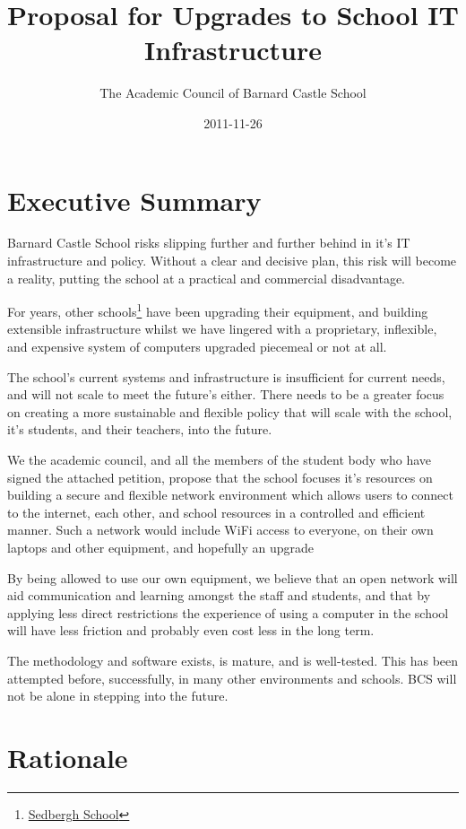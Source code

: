 \documentclass[a4paper,leqno,titlepage]{article}
\title{Proposal for Upgrades to School IT Infrastructure}
\author{The Academic Council of Barnard Castle School}
\date{2011-11-26}
\begin{document}
\maketitle

\section{Executive Summary}

Barnard Castle School risks slipping further and further behind in it's
IT infrastructure and policy.
Without a clear and decisive plan, this risk will become a reality, putting
the school at a practical and commercial disadvantage.


For years, other schools\footnote{\href{http://www.sedberghschool.org/ict.html}{Sedbergh School}} 
have been upgrading their equipment, and building extensible infrastructure
whilst we have lingered with a proprietary, inflexible, and expensive system of
computers upgraded piecemeal or not at all.


The school's current systems and infrastructure is insufficient for current
needs, and will not scale to meet the future's either.
There needs to be a greater focus on creating a more sustainable and flexible
policy that will scale with the school, it's students, and their teachers, into
the future.


We the academic council, and all the members of the student body who have signed
the attached petition, propose that the school focuses it's resources on building
a secure and flexible network environment which allows users to connect to the
internet, each other, and school resources in a controlled and efficient manner.
Such a network would include WiFi access to everyone, on their own laptops and
other equipment, and hopefully an upgrade 


By being allowed to use our own equipment, we believe that an open network will
aid communication and learning amongst the staff and students, and that by
applying less direct restrictions the experience of using a computer in the
school will have less friction and probably even cost less in the long term.


The methodology and software exists, is mature, and is well-tested. This has been
attempted before, successfully, in many other environments and schools. BCS will
not be alone in stepping into the future.


\break

\section{Rationale}
\end{document}
